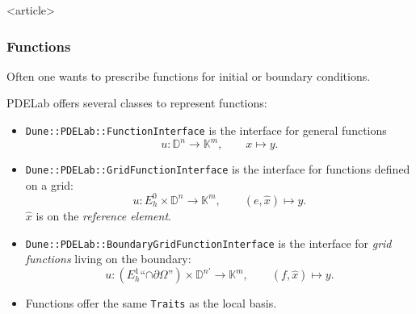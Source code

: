 
\begin{frame}<article>
\frametitle{Functions}
Often one wants to prescribe functions for initial or boundary
conditions.

PDELab offers several classes to represent functions:
\begin{itemize}
\item \lstinline{Dune::PDELab::FunctionInterface} is the interface for general
functions $$u : \mathbb{D}^n \to \mathbb{K}^m, \qquad x \mapsto y.$$ 
\item \lstinline{Dune::PDELab::GridFunctionInterface} is the interface
for functions defined on a grid:
$$u : E_h^0 \times \mathbb{D}^n \to \mathbb{K}^m, \qquad
(e,\hat{x}) \mapsto y.$$
$\hat{x}$ is on the \textit{reference element}.
\item \lstinline{Dune::PDELab::BoundaryGridFunctionInterface} is the
interface for \textit{grid functions} living on the boundary:
$$u : (E_h^1\text{``$\cap\partial\Omega$''}) \times \mathbb{D}^{n'} \to \mathbb{K}^m, \qquad
(f,\hat{x}) \mapsto y.$$
\item Functions offer the same \lstinline{Traits} as the local basis.
\end{itemize}
\end{frame}


